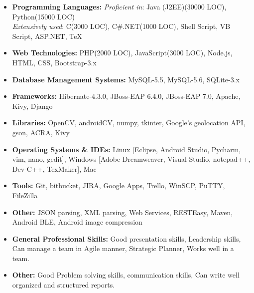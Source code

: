 \documentclass[11pt,letterpaper,sans]{moderncv}        %
\begin{document}
\begin{itemize}

\item \textbf{Programming Languages:} \emph{Proficient in}: Java (J2EE)(30000 LOC), Python(15000 LOC) \\ \emph{Extensively used}: C(3000 LOC), C\#.NET(1000 LOC), Shell Script, VB Script, ASP.NET, TeX

\vspace{2pt}

\item \textbf{Web Technologies:} PHP(2000 LOC), JavaScript(3000 LOC), Node.js, HTML, CSS, Bootstrap-3.x

\vspace{2pt}

\item \textbf{Database Management Systems:} MySQL-5.5, MySQL-5.6, SQLite-3.x

\vspace{2pt}

\item \textbf{Frameworks:} Hibernate-4.3.0, JBoss-EAP 6.4.0, JBoss-EAP 7.0, Apache, Kivy, Django

\vspace{2pt}

\item \textbf{Libraries:} OpenCV, androidCV, numpy, tkinter, Google's geolocation API, gson, ACRA, Kivy

\vspace{2pt}

\item \textbf{Operating Systems \& IDEs:} Linux [Eclipse, Android Studio, Pycharm, vim, nano, gedit], Windows [Adobe Dreamweaver, Visual Studio, notepad++, Dev-C++, TexMaker], Mac

\vspace{2pt}

\item \textbf{Tools:} Git, bitbucket, JIRA, Google Apps, Trello, WinSCP, PuTTY, FileZilla

\vspace{2pt}

\item \textbf{Other:} JSON parsing, XML parsing, Web Services, RESTEasy, Maven, Android BLE, Android image compression

\vspace{2pt}

\item \textbf{General Professional Skills:} Good presentation skills, Leadership skills, Can manage a team in Agile manner, Strategic Planner, Works well in a team.

\vspace{2pt}

\item \textbf{Other:} Good Problem solving skills, communication skills, Can write well organized and structured reports.

\end{itemize}
\end{document}
